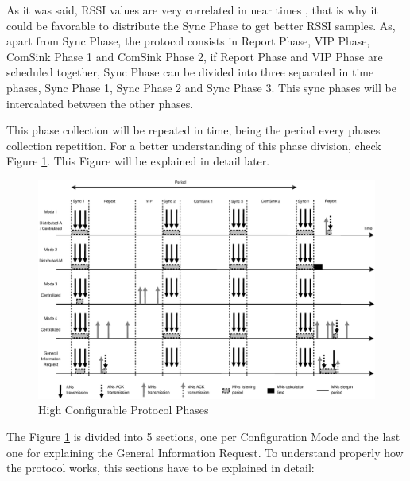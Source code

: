 As it was said, \ac{RSSI} values are very correlated in near times \cite{RSSIcorrelated}, that is why it could be favorable to distribute the 
Sync Phase to get better \ac{RSSI} samples. As, apart from Sync Phase, the protocol consists in Report Phase, \ac{VIP}
Phase, ComSink Phase 1 and ComSink Phase 2, if Report Phase and \ac{VIP} Phase are scheduled together, Sync Phase can be divided into three
separated in time phases, Sync Phase 1, Sync Phase 2 and Sync Phase 3. This sync phases will be intercalated between the other phases.

This phase collection will be repeated in time, being the period every phases collection repetition. For a better understanding of this 
phase division, check Figure \ref{fig:ProtocolPhases}. This Figure will be explained in detail later.

\begin{figure}[ht]
 \begin{center}
  \includegraphics[width=1\textwidth]{ProtocolPhases.eps}
 \end{center}
 \caption{High Configurable Protocol Phases \cite{mipaper}}
 \label{fig:ProtocolPhases}
\end{figure}

The Figure \ref{fig:ProtocolPhases} is divided into 5 sections, one per Configuration Mode and the last one for explaining the General Information
Request. To understand properly how the protocol works, this sections have to be explained in detail:

